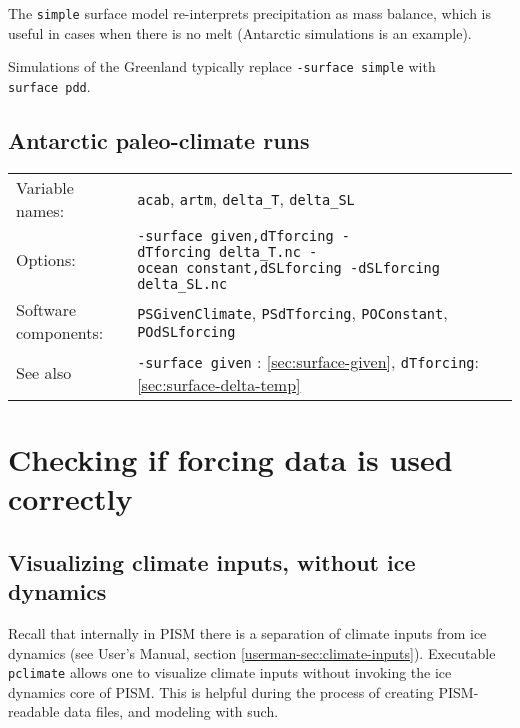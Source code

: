 \documentclass[titlepage,letterpaper,final]{scrartcl}
\def\optsection#1{%
  \def\optindex##1{\index[options]{#1!##1}}
  \def\optseealso##1{\index[options]{#1|see{##1}}}
}
\begin{document}
The \texttt{simple} surface model re-interprets precipitation as mass balance, which is useful in cases when there is no melt (Antarctic simulations is an example).

Simulations of the Greenland typically replace \texttt{-surface~simple} with \texttt{surface~pdd}.

\subsection{Antarctic paleo-climate runs}
\label{sec:use-case-antarctica-paleo}

\begin{center}
  \begin{tabular}{lp{}}
    \toprule
    Variable names: & \texttt{acab}, \texttt{artm}, \texttt{delta_T}, \texttt{delta_SL}\\
    Options: & \texttt{-surface given,dTforcing \mbox{-dTforcing delta_T.nc}
      \mbox{-ocean constant,dSLforcing} -dSLforcing delta_SL.nc} \\
    Software   components:  &   \texttt{PSGivenClimate},  \texttt{PSdTforcing},
    \texttt{POConstant}, \texttt{POdSLforcing}\\
    See   also    &   \texttt{-surface~given}    :   \ref{sec:surface-given},
    \texttt{dTforcing}: \ref{sec:surface-delta-temp}\\
    \bottomrule
  \end{tabular}
\end{center}

\section{Checking if forcing data is used correctly}
\label{sec:checking-forcing}


\subsection{Visualizing climate inputs, without ice dynamics}
\label{sec:pclimate}
\optsection{\texttt{pclimate} options}

Recall that internally in PISM there is a separation of climate inputs from ice
dynamics (see User's Manual, section \ref*{userman-sec:climate-inputs}). Executable
\texttt{pclimate}  allows one to visualize climate inputs without
invoking the ice dynamics core of PISM. This is helpful during the process of
creating PISM-readable data files, and modeling with such.
\end{document}
